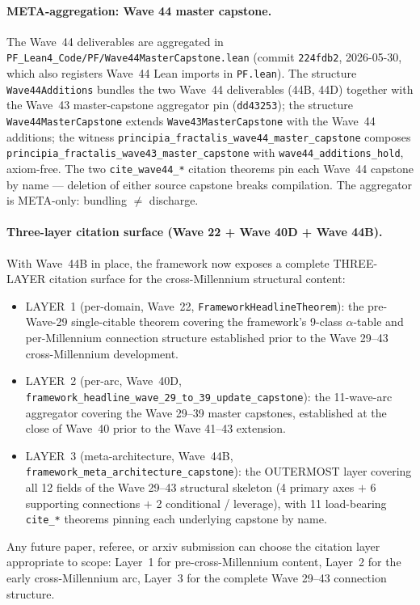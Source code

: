 \paragraph{META-aggregation: Wave 44 master capstone.} The Wave~44
deliverables are aggregated in
\texttt{PF\_Lean4\_Code/PF/Wave44MasterCapstone.lean} (commit
\texttt{224fdb2}, 2026-05-30, which also registers Wave~44 Lean
imports in \texttt{PF.lean}). The structure \texttt{Wave44Additions}
bundles the two Wave~44 deliverables (44B, 44D) together with the
Wave~43 master-capstone aggregator pin (\texttt{dd43253}); the
structure \texttt{Wave44MasterCapstone} extends
\texttt{Wave43MasterCapstone} with the Wave~44 additions; the
witness \texttt{principia\_fractalis\_wave44\_master\_capstone}
composes \texttt{principia\_fractalis\_wave43\_master\_capstone}
with \texttt{wave44\_additions\_hold}, axiom-free. The two
\texttt{cite\_wave44\_*} citation theorems pin each Wave~44 capstone
by name --- deletion of either source capstone breaks compilation.
The aggregator is META-only: bundling $\neq$ discharge.

\paragraph{Three-layer citation surface (Wave 22 + Wave 40D + Wave 44B).}
With Wave~44B in place, the framework now exposes a complete
THREE-LAYER citation surface for the cross-Millennium structural
content:
\begin{itemize}
\item LAYER~1 (per-domain, Wave~22, \texttt{FrameworkHeadlineTheorem}):
  the pre-Wave-29 single-citable theorem covering the framework's
  9-class $\alpha$-table and per-Millennium connection structure
  established prior to the Wave 29--43 cross-Millennium development.
\item LAYER~2 (per-arc, Wave~40D,
  \texttt{framework\_headline\_wave\_29\_to\_39\_update\_capstone}):
  the 11-wave-arc aggregator covering the Wave 29--39 master
  capstones, established at the close of Wave~40 prior to the
  Wave 41--43 extension.
\item LAYER~3 (meta-architecture, Wave~44B,
  \texttt{framework\_meta\_architecture\_capstone}): the OUTERMOST
  layer covering all 12 fields of the Wave 29--43 structural
  skeleton (4 primary axes $+$ 6 supporting connections $+$ 2
  conditional / leverage), with 11 load-bearing \texttt{cite\_*}
  theorems pinning each underlying capstone by name.
\end{itemize}
Any future paper, referee, or arxiv submission can choose the
citation layer appropriate to scope: Layer~1 for pre-cross-Millennium
content, Layer~2 for the early cross-Millennium arc, Layer~3 for
the complete Wave 29--43 connection structure.

